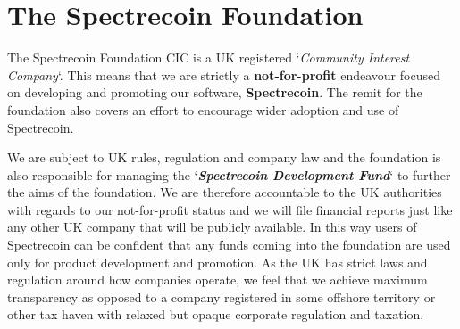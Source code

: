 \section{The Spectrecoin Foundation}
The Spectrecoin Foundation CIC is a UK registered ‘\textit{Community Interest Company}‘.
This means that we are strictly a \textbf{not-for-profit} endeavour focused
on developing and promoting our software, \textbf{Spectrecoin}. The remit
for the foundation also covers an effort to encourage wider adoption and
use of Spectrecoin.



We are subject to UK rules, regulation and company law and the foundation
is also responsible for managing the ‘\textbf{\textit{Spectrecoin Development Fund}}‘
to further the aims of the foundation. We are therefore accountable to
the UK authorities with regards to our not-for-profit status and we will
file financial reports just like any other UK company that will be publicly
available. In this way users of Spectrecoin can be confident that any funds
coming into the foundation are used only for product development and
promotion. As the UK has strict laws and regulation around how companies
operate, we feel that we achieve maximum transparency as opposed to a company
registered in some offshore territory or other tax haven with relaxed but
opaque corporate regulation and taxation.



